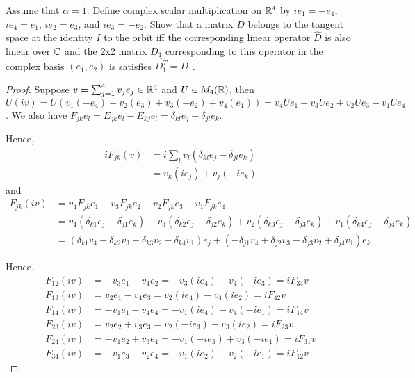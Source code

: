 \documentclass{article}
\begin{document}
 Assume that $\alpha = 1$. Define complex scalar multiplication on $\mathbb{R}^4$ by $ie_1 = - e_4$, $ie_4 = e_1$, $ie_2 = e_3$, and $ie_3 = -e_2$. Show that a matrix $D$ belongs to the tangent space at the identity $I$ to the orbit iff the corresponding linear operator $\widehat D$ is also linear over $\mathbb{C}$ and the 2x2 matrix $D_1$ corresponding to this operator in the complex basis $(e_1, e_2)$ is satisfies $\overline {D_1^T} = D_1$.
\begin{proof}

Suppose $v = \sum_{j=1}^4 v_j e_j \in \mathbb{R}^4$ and $U \in M_4(\mathbb{R})$, then $U (iv) =  U (v_1(-e_4) + v_2(e_3) + v_3(-e_2) + v_4(e_1)) = v_4 Ue_1 -v_3 Ue_2 + v_2 Ue_3 - v_1 Ue_4$. We also have $F_{jk} e_l = E_{jk} e_l - E_{kj} e_l = \delta_{kl} e_j - \delta_{jl} e_k$.

Hence, 
\begin{align*}
i F_{jk}(v) & = i \sum_l v_l (\delta_{kl}  e_j - \delta_{jl} e_k)
\\ & = v_k (ie_j) +  v_j (-i e_k)
\end{align*}
and
\begin{align*}
F_{jk}(iv) & = v_4 F_{jk}e_1 - v_3 F_{jk}e_2 + v_2 F_{jk}e_3 - v_1 F_{jk}e_4
\\ & = v_4 (\delta_{k1} e_j  - \delta_{j1} e_k) - v_3 (\delta_{k2} e_j  - \delta_{j2} e_k) + v_2 (\delta_{k3} e_j  - \delta_{j3} e_k) - v_1 (\delta_{k4} e_j  - \delta_{j4} e_k)
\\ &  = (\delta_{k1} v_4 - \delta_{k2}v_3 + \delta_{k3}v_2 - \delta_{k4} v_1) e_j + (-\delta_{j1} v_4 + \delta_{j2} v_3 - \delta_{j3} v_2 + \delta_{j4} v_1) e_k
\end{align*}

Hence, 
\begin{align*}
F_{12}(iv) & = - v_3 e_1 -v_4 e_2 = - v_3 (i e_4) - v_4 (-i e_3) = i F_{34}v
\\ F_{13}(iv) & =  v_2 e_1 -v_4 e_3 = v_2 (i e_4) - v_4 (i e_2) = i F_{42}v
\\ F_{14}(iv) & = - v_1 e_1 - v_4 e_4 = -v_1 (i e_4) - v_4 (-i e_1) = i F_{14} v
\\ F_{23}(iv) & = v_2 e_2 + v_3 e_3 =  v_2 ( -i e_3) + v_3 (i e_2) = i F_{23} v
\\ F_{24}(iv) & = -v_1 e_2 + v_3 e_4 =  -v_1 (-i e_3) + v_3 (- i e_1) = i F_{31} v
\\ F_{34}(iv) & = -v_1 e_3 - v_2 e_4 = -v_1 (i e_2) - v_2 (-i e_1) = i F_{12} v
\end{align*}


\end{proof}
\end{document}
